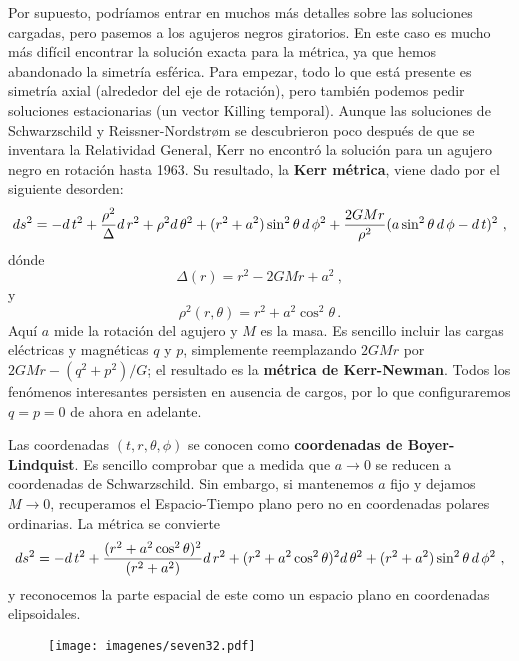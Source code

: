 \documentclass[11pt,b5paper,openany,twoside]{book}
\begin{document}
Por supuesto, podríamos entrar en muchos más detalles sobre las soluciones cargadas, pero pasemos a los agujeros negros giratorios.
En este caso es mucho más difícil encontrar la solución exacta para la métrica, ya que hemos abandonado la simetría esférica.
Para empezar, todo lo que está presente es simetría axial (alrededor del eje de rotación), pero también podemos pedir soluciones estacionarias (un vector Killing temporal).
Aunque las soluciones de Schwarzschild y Reissner-Nordstr{\o}m se descubrieron poco después de que se inventara la Relatividad General, Kerr no encontró la solución para un agujero negro en rotación hasta 1963.
Su resultado, la {\bf Kerr métrica}, viene dado por el siguiente desorden:
\begin{equation}
ds^2 = - d\,t^2 + {{\rho^2}\over \Delta} d\,r^2 +\rho^2 d\,\theta^2
+(r^2+a^2)\sin^2\theta\, d\,\phi^2 +{{2GMr}\over{\rho^2}}
(a\sin^2\theta\, d\,\phi -  d\,t)^2\ ,\label{7.114}
\end{equation}
dónde
\begin{equation}
\Delta(r) = r^2 - 2GMr +a^2\ ,\label{7.115}
\end{equation}
y
\begin{equation}
\rho^2(r,\theta) = r^2+a^2\cos^2\theta\,.\label{7.116}
\end{equation}
Aquí $a$ mide la rotación del agujero y $M$ es la masa.
Es sencillo incluir las cargas eléctricas y magnéticas $q$ y $p$, simplemente reemplazando $2GMr$ por $2GMr-(q^2+p^2)/G$; el resultado es la {\bf métrica de Kerr-Newman}.
Todos los fenómenos interesantes persisten en ausencia de cargos, por lo que configuraremos $q=p=0$ de ahora en adelante.

Las coordenadas $(t,r,\theta,\phi)$ se conocen como {\bf coordenadas de Boyer-Lindquist}.
Es sencillo comprobar que a medida que $a\rightarrow 0$ se reducen a coordenadas de Schwarzschild.
Sin embargo, si mantenemos $a$ fijo y dejamos $M\rightarrow 0$, recuperamos el Espacio-Tiempo plano pero no en coordenadas polares ordinarias.
La métrica se convierte
\begin{equation}
ds^2 = - d\,t^2 + {{(r^2+a^2\cos^2\theta)^2}\over (r^2+a^2)} d\,r^2
+(r^2+a^2\cos^2\theta)^2 d\,\theta^2
+(r^2+a^2)\sin^2\theta\, d\,\phi^2\ ,\label{7.117}
\end{equation}
y reconocemos la parte espacial de este como un espacio plano en coordenadas elipsoidales.

\begin{figure}[h]
\centering
\texttt{[image: imagenes/seven32.pdf]}
\end{figure}
\end{document}

